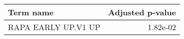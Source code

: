 \begin{tabular}{lr}
\toprule
           Term name &  Adjusted p-value \\
\midrule
 RAPA EARLY UP.V1 UP &          1.82e-02 \\
\bottomrule
\end{tabular}
